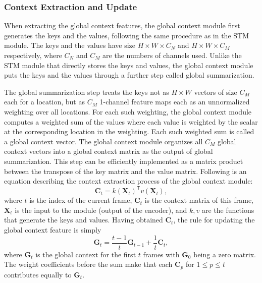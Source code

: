 \documentclass[runningheads]{llncs}
\begin{document}
\subsubsection{Context Extraction and Update}

When extracting the global context features, the global context module first generates the keys and the values, following the same procedure as in the STM module. The keys and the values have size $H \times W \times C_N$ and $H \times W \times C_M$ respectively, where $C_N$ and $C_M$ are the numbers of channels used. Unlike the STM module that directly stores the keys and values, the global context module puts the keys and the values through a further step called global summarization.

The global summarization step treats the keys not as $H \times W$ vectors of size $C_M$ each for a location, but as $C_M$ 1-channel feature maps each as an unnormalized weighting over all locations. For each such weighting, the global context module computes a weighted sum of the values where each value is weighted by the scalar at the corresponding location in the weighting. Each such weighted sum is called a global context vector. The global context module organizes all $C_M$ global context vectors into a global context matrix as the output of global summarization. This step can be efficiently implemented as a matrix product between the transpose of the key matrix and the value matrix. Following is an equation describing the context extraction process of the global context module:
\begin{equation}
\label{eq:eq1}
    \bm{C}_t = k(\bm{X}_t)^\mathsf{T}v(\bm{X}_t),
\end{equation}
where $t$ is the index of the current frame, $\bm{C}_t$ is the context matrix of this frame, $\bm{X}_t$ is the input to the module (output of the encoder), and $k, v$ are the functions that generate the keys and values. Having obtained $\bm{C}_t$, the rule for updating the global context feature is simply
\begin{equation}
\label{eq:eq2}
    \bm{G}_t = \frac{t-1}{t}\bm{G}_{t-1} + \frac{1}{t}\bm{C}_t,
\end{equation}
where $\bm{G}_t$ is the global context for the first $t$ frames with $\bm{G}_0$ being a zero matrix. The weight coefficients before the sum make that each $\bm{C}_p$ for $1 \le p \le t$ contributes equally to $\bm{G}_t$.
\end{document}
